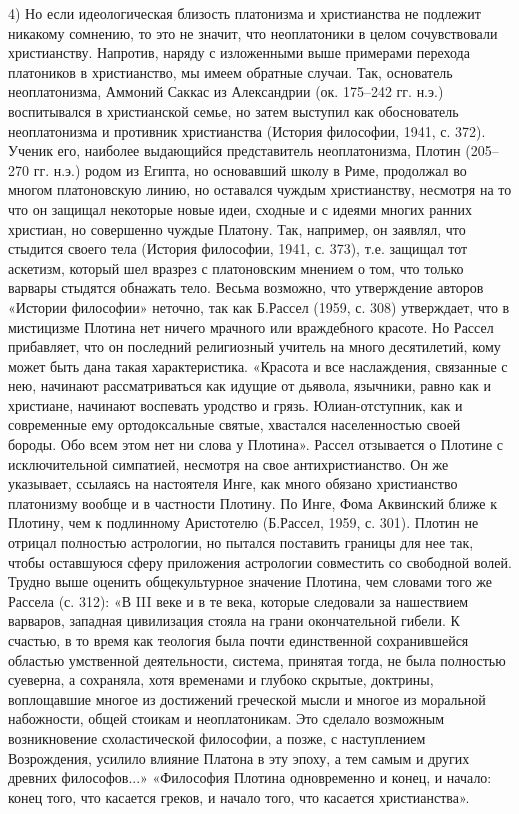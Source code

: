 4)  Но  если  идеологическая  близость платонизма  и  христианства  не
подлежит  никакому сомнению,  то  это не  значит,  что неоплатоники  в
целом сочувствовали христианству. Напротив,  наряду с изложенными выше
примерами  перехода  платоников  в  христианство,  мы  имеем  обратные
случаи. Так,  основатель неоплатонизма, Аммоний Саккас  из Александрии
(ок. 175--242  гг. н.э.) воспитывался  в христианской семье,  но затем
выступил  как  обоснователь  неоплатонизма  и  противник  христианства
(История  философии, 1941,  с. 372).  Ученик его,  наиболее выдающийся
представитель  неоплатонизма,  Плотин  (205--270 гг.  н.э.)  родом  из
Египта, но основавший  школу в Риме, продолжал  во многом платоновскую
линию, но оставался чуждым христианству, несмотря на то что он защищал
некоторые новые  идеи, сходные и  с идеями многих ранних  христиан, но
совершенно  чуждые Платону.  Так, например,  он заявлял,  что стыдится
своего  тела  (История философии,  1941,  с.  373), т.е.  защищал  тот
аскетизм, который шел вразрез с платоновским мнением о том, что только
варвары  стыдятся  обнажать  тело. Весьма  возможно,  что  утверждение
авторов  «Истории  философии»  неточно,  так как  Б.Рассел  (1959,  с.
308)  утверждает,  что  в   мистицизме  Плотина  нет  ничего  мрачного
или  враждебного  красоте.  Но  Рассел прибавляет,  что  он  последний
религиозный  учитель  на  много  десятилетий,  кому  может  быть  дана
такая  характеристика. «Красота  и все  наслаждения, связанные  с нею,
начинают рассматриваться как идущие от  дьявола, язычники, равно как и
христиане, начинают воспевать уродство и грязь. Юлиан-отступник, как и
современные ему  ортодоксальные святые, хвастался  населенностью своей
бороды. Обо  всем этом нет  ни слова  у Плотина». Рассел  отзывается о
Плотине с исключительной симпатией, несмотря на свое антихристианство.
Он  же  указывает, ссылаясь  на  настоятеля  Инге, как  много  обязано
христианство платонизму  вообще и в  частности Плотину. По  Инге, Фома
Аквинский  ближе к  Плотину,  чем к  подлинному Аристотелю  (Б.Рассел,
1959,  с. 301).  Плотин не  отрицал полностью  астрологии, но  пытался
поставить  границы  для нее  так,  чтобы  оставшуюся сферу  приложения
астрологии  совместить   со  свободной  волей.  Трудно   выше  оценить
общекультурное значение Плотина, чем словами того же Рассела (с. 312):
«В III  веке и в  те века,  которые следовали за  нашествием варваров,
западная цивилизация стояла на  грани окончательной гибели. К счастью,
в то время как теология была почти единственной сохранившейся областью
умственной деятельности,  система, принятая  тогда, не  была полностью
суеверна,  а сохраняла,  хотя временами  и глубоко  скрытые, доктрины,
воплощавшие многое из достижений греческой мысли и многое из моральной
набожности,  общей  стоикам  и неоплатоникам.  Это  сделало  возможным
возникновение  схоластической  философии,   а  позже,  с  наступлением
Возрождения, усилило влияние Платона в эту эпоху, а тем самым и других
древних  философов...»  «Философия  Плотина одновременно  и  конец,  и
начало: конец того,  что касается греков, и начало  того, что касается
христианства».

